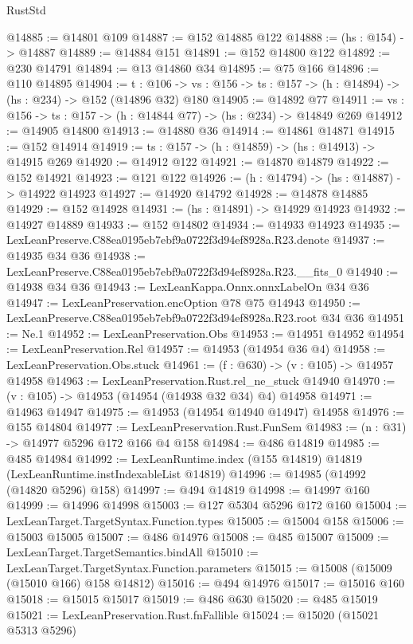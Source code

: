 \begin{lexlean}{RustStd}
\begin{coremodule}
@14885 := @14801 @109
@14887 := @152 @14885 @122
@14888 := (hs : @154) -> @14887
@14889 := @14884 @151
@14891 := @152 @14800 @122
@14892 := @230 @14791
@14894 := @13 @14860 @34
@14895 := @75 @166
@14896 := @110 @14895
@14904 := {t : @106} ->
  {vs : @156} -> {ts : @157} -> (h : @14894) -> (hs : @234) -> @152 (@14896 @32) @180
@14905 := @14892 @77
@14911 := {vs : @156} -> {ts : @157} -> (h : @14844 @77) -> (hs : @234) -> @14849 @269
@14912 := @14905 @14800
@14913 := @14880 @36
@14914 := @14861 @14871
@14915 := @152 @14914
@14919 := {ts : @157} -> (h : @14859) -> (hs : @14913) -> @14915 @269
@14920 := @14912 @122
@14921 := @14870 @14879
@14922 := @152 @14921
@14923 := @121 @122
@14926 := (h : @14794) -> (hs : @14887) -> @14922 @14923
@14927 := @14920 @14792
@14928 := @14878 @14885
@14929 := @152 @14928
@14931 := (hs : @14891) -> @14929 @14923
@14932 := @14927 @14889
@14933 := @152 @14802
@14934 := @14933 @14923
@14935 := LexLeanPreserve.C88ea0195eb7ebf9a0722f3d94ef8928a.R23.denote
@14937 := @14935 @34 @36
@14938 := LexLeanPreserve.C88ea0195eb7ebf9a0722f3d94ef8928a.R23.__fits_0
@14940 := @14938 @34 @36
@14943 := LexLeanKappa.Onnx.onnxLabelOn @34 @36
@14947 := LexLeanPreservation.encOption @78 @75 @14943
@14950 := LexLeanPreserve.C88ea0195eb7ebf9a0722f3d94ef8928a.R23.root @34 @36
@14951 := Ne.{1}
@14952 := LexLeanPreservation.Obs
@14953 := @14951 @14952
@14954 := LexLeanPreservation.Rel
@14957 := @14953 (@14954 @36 @4)
@14958 := LexLeanPreservation.Obs.stuck
@14961 := (f : @630) -> (v : @105) -> @14957 @14958
@14963 := LexLeanPreservation.Rust.rel_ne_stuck @14940
@14970 := (v : @105) -> @14953 (@14954 (@14938 @32 @34) @4) @14958
@14971 := @14963 @14947
@14975 := @14953 (@14954 @14940 @14947) @14958
@14976 := @155 @14804
@14977 := LexLeanPreservation.Rust.FunSem
@14983 := (n : @31) -> @14977 @5296 @172 @166 @4 @158
@14984 := @486 @14819
@14985 := @485 @14984
@14992 := LexLeanRuntime.index (@155 @14819) @14819 (LexLeanRuntime.instIndexableList @14819)
@14996 := @14985 (@14992 (@14820 @5296) @158)
@14997 := @494 @14819
@14998 := @14997 @160
@14999 := @14996 @14998
@15003 := @127 @5304 @5296 @172 @160
@15004 := LexLeanTarget.TargetSyntax.Function.types
@15005 := @15004 @158
@15006 := @15003 @15005
@15007 := @486 @14976
@15008 := @485 @15007
@15009 := LexLeanTarget.TargetSemantics.bindAll
@15010 := LexLeanTarget.TargetSyntax.Function.parameters
@15015 := @15008 (@15009 (@15010 @166) @158 @14812)
@15016 := @494 @14976
@15017 := @15016 @160
@15018 := @15015 @15017
@15019 := @486 @630
@15020 := @485 @15019
@15021 := LexLeanPreservation.Rust.fnFallible
@15024 := @15020 (@15021 @5313 @5296)

\end{coremodule}
\end{lexlean}
